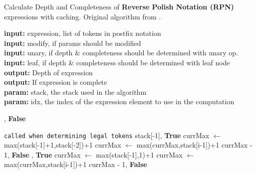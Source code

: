 \documentclass[12pt]{iopart}
\begin{document}
\begin{algorithm}
\scriptsize
\caption{Calculate Depth and Completeness of \textbf{Reverse Polish Notation (RPN)} expressions with caching.  Original algorithm from \cite{77128902}.}
\label{alg:getRPNdepth_cache}
\hspace*{\algorithmicindent} \textbf{input:}  expression, list of tokens in postfix notation \\
\hspace*{\algorithmicindent} \textbf{input:}  modify, if params should be modified \\
\hspace*{\algorithmicindent} \textbf{input:}  unary, if depth \& completeness should be determined with unary op.  \\
\hspace*{\algorithmicindent} \textbf{input:} leaf, if depth \& completeness should be determined with leaf node \\
\hspace*{\algorithmicindent} \textbf{output:} Depth of expression\\
\hspace*{\algorithmicindent} \textbf{output:} If expression is complete \\
\hspace*{\algorithmicindent} \textbf{param:} stack, the stack used in the algorithm \\
\hspace*{\algorithmicindent} \textbf{param:} idx, the index of the expression element to use in the computation
\begin{algorithmic}[1]
        \State {}, \textbf{False}
    \EndIf

     \Comment\texttt{{called when determining legal tokens}}
                \State \Return stack[-1], \textbf{True}
            \Else
                \State currMax $\gets$ max(stack[-1]+1,stack[-2])+1
                    \State currMax $\gets$ max(currMax,stack[i-1])+1
                \EndFor
                \State \Return currMax - 1, \textbf{False}
            \EndIf
                \State {}, \textbf{True}
            \Else
                \State currMax $\gets$ max(stack[-1],1)+1
                    \State currMax $\gets$ max(currMax,stack[i-1])+1
                \EndFor
                \State \Return currMax - 1, \textbf{False}
            \EndIf
                

\end{algorithmic}
\end{algorithm}
\end{document}
